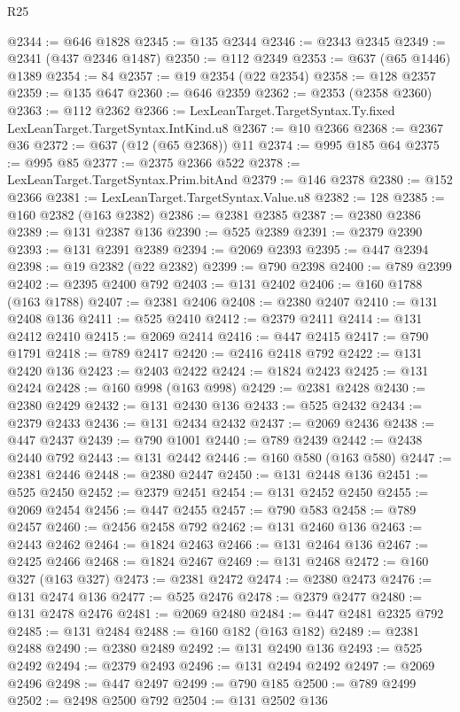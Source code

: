 \begin{lexlean}{R25}
\begin{coremodule}
@2344 := @646 @1828
@2345 := @135 @2344
@2346 := @2343 @2345
@2349 := @2341 (@437 @2346 @1487)
@2350 := @112 @2349
@2353 := @637 (@65 @1446) @1389
@2354 := 84
@2357 := @19 @2354 (@22 @2354)
@2358 := @128 @2357
@2359 := @135 @647
@2360 := @646 @2359
@2362 := @2353 (@2358 @2360)
@2363 := @112 @2362
@2366 := LexLeanTarget.TargetSyntax.Ty.fixed LexLeanTarget.TargetSyntax.IntKind.u8
@2367 := @10 @2366
@2368 := @2367 @36
@2372 := @637 (@12 (@65 @2368)) @11
@2374 := @995 @185 @64
@2375 := @995 @85
@2377 := @2375 @2366 @522
@2378 := LexLeanTarget.TargetSyntax.Prim.bitAnd
@2379 := @146 @2378
@2380 := @152 @2366
@2381 := LexLeanTarget.TargetSyntax.Value.u8
@2382 := 128
@2385 := @160 @2382 (@163 @2382)
@2386 := @2381 @2385
@2387 := @2380 @2386
@2389 := @131 @2387 @136
@2390 := @525 @2389
@2391 := @2379 @2390
@2393 := @131 @2391 @2389
@2394 := @2069 @2393
@2395 := @447 @2394
@2398 := @19 @2382 (@22 @2382)
@2399 := @790 @2398
@2400 := @789 @2399
@2402 := @2395 @2400 @792
@2403 := @131 @2402
@2406 := @160 @1788 (@163 @1788)
@2407 := @2381 @2406
@2408 := @2380 @2407
@2410 := @131 @2408 @136
@2411 := @525 @2410
@2412 := @2379 @2411
@2414 := @131 @2412 @2410
@2415 := @2069 @2414
@2416 := @447 @2415
@2417 := @790 @1791
@2418 := @789 @2417
@2420 := @2416 @2418 @792
@2422 := @131 @2420 @136
@2423 := @2403 @2422
@2424 := @1824 @2423
@2425 := @131 @2424
@2428 := @160 @998 (@163 @998)
@2429 := @2381 @2428
@2430 := @2380 @2429
@2432 := @131 @2430 @136
@2433 := @525 @2432
@2434 := @2379 @2433
@2436 := @131 @2434 @2432
@2437 := @2069 @2436
@2438 := @447 @2437
@2439 := @790 @1001
@2440 := @789 @2439
@2442 := @2438 @2440 @792
@2443 := @131 @2442
@2446 := @160 @580 (@163 @580)
@2447 := @2381 @2446
@2448 := @2380 @2447
@2450 := @131 @2448 @136
@2451 := @525 @2450
@2452 := @2379 @2451
@2454 := @131 @2452 @2450
@2455 := @2069 @2454
@2456 := @447 @2455
@2457 := @790 @583
@2458 := @789 @2457
@2460 := @2456 @2458 @792
@2462 := @131 @2460 @136
@2463 := @2443 @2462
@2464 := @1824 @2463
@2466 := @131 @2464 @136
@2467 := @2425 @2466
@2468 := @1824 @2467
@2469 := @131 @2468
@2472 := @160 @327 (@163 @327)
@2473 := @2381 @2472
@2474 := @2380 @2473
@2476 := @131 @2474 @136
@2477 := @525 @2476
@2478 := @2379 @2477
@2480 := @131 @2478 @2476
@2481 := @2069 @2480
@2484 := @447 @2481 @2325 @792
@2485 := @131 @2484
@2488 := @160 @182 (@163 @182)
@2489 := @2381 @2488
@2490 := @2380 @2489
@2492 := @131 @2490 @136
@2493 := @525 @2492
@2494 := @2379 @2493
@2496 := @131 @2494 @2492
@2497 := @2069 @2496
@2498 := @447 @2497
@2499 := @790 @185
@2500 := @789 @2499
@2502 := @2498 @2500 @792
@2504 := @131 @2502 @136

\end{coremodule}
\end{lexlean}
